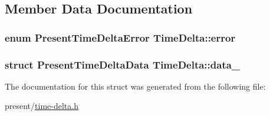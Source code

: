\subsection{\-Member \-Data \-Documentation}
\hypertarget{structTimeDelta_a212d89d50dc636a4e12ceac5fd9f0bfd}{
\subsubsection[{error}]{\setlength{\rightskip}{0pt plus 5cm}enum {\bf \-Present\-Time\-Delta\-Error} {\bf \-Time\-Delta\-::error}}}\label{structTimeDelta_a212d89d50dc636a4e12ceac5fd9f0bfd}
\hypertarget{structTimeDelta_ab88989772d6ab486e1e008238d96eb81}{
\subsubsection[{data\-\_\-}]{\setlength{\rightskip}{0pt plus 5cm}struct \-Present\-Time\-Delta\-Data {\bf \-Time\-Delta\-::data\-\_\-}}}\label{structTimeDelta_ab88989772d6ab486e1e008238d96eb81}


\-The documentation for this struct was generated from the following file\-:\begin{DoxyCompactItemize}
\item 
present/\hyperlink{time-delta_8h}{time-\/delta.\-h}\end{DoxyCompactItemize}
